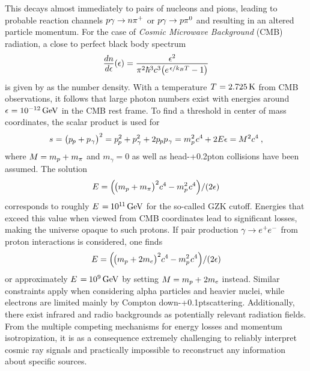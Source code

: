 This decays almost immediately to pairs of nucleons and pions, leading to probable reaction channels
$p\gamma \rightarrow \kern-0.1pt n\smash{\pi^+}$ or $p\gamma \rightarrow \kern+0.2pt p \smash{\pi^0}$ and resulting in an altered
particle momentum. For the case of \emph{Cosmic Microwave Background} (CMB) radiation, a close to perfect black
body spectrum
\begin{equation*}
	\frac{\raisebox{-0.3ex}{$dn$}}{\raisebox{0.15ex}{$d\epsilon$}} (\epsilon) \kern+0.2pt =
	\frac{\raisebox{-0.3ex}{$\epsilon^2$}}{\pi^2 \hbar^3 c^3 \bigl( e^{\kern+1.0pt \epsilon / k_B T} - 1 \bigr)}
\end{equation*}
is given by \cite{Gaisser_2016} as the number density. With a temperature $\kern+0.5pt T \kern+0.5pt = \qty{2.725}{\kelvin}$ from CMB
observations, it follows that large photon numbers exist with energies around $\epsilon \kern+0.5pt = \qty{e-12}{\giga\electronvolt}$
in the CMB rest frame. To find a threshold in center of mass coordinates, the scalar product is used for
\begin{equation*}
	s \kern+0.3pt = \bigl( p_{\kern-0.5pt p} + p_{\kern+0.5pt \gamma} \bigr)^2 =
	p_{\kern-0.5pt p}^2 + p_{\kern+0.5pt \gamma}^2 + 2 p_{\kern-0.5pt p} p_{\kern+0.5pt \gamma} =
	m_p^2 \kern+0.8pt c^4 \kern-0.2pt + 2 E \epsilon = \kern-0.2pt M^2c^4 \: ,
\end{equation*}
where $M \kern-0.3pt = m_p + \kern+0.3pt m_\pi$ and $m_\gamma = 0$ as well as head-{\kern+0.2pt}on collisions have been assumed. The solution
\begin{equation*}
	E = \Bigl( \kern-1.0pt \bigl( m_p + m_\pi \bigr)^2 c^4 \kern-0.2pt - m_p^2 \kern+0.8pt c^4 \Bigr) / (2\epsilon)
\end{equation*}
corresponds to roughly $E \kern+1.0pt = \kern-0.5pt 10^{1 \kern-0.3pt 1} \kern+1.5pt \unit{\giga\electronvolt}$ for the so-called
GZK cutoff. Energies that exceed this value when viewed from CMB coordinates lead to significant losses, making the universe
opaque to such protons. If pair production $\gamma \kern-0.5pt \rightarrow \smash{e^+ \kern-0.5pt e^-}$ from proton interactions is
considered, one finds
\begin{equation*}
	E = \Bigl( \kern-1.0pt \bigl( m_p + 2m_e \bigr)^2 c^4 \kern-0.2pt - m_p^2 \kern+0.8pt c^4 \Bigr) / (2\epsilon)
\end{equation*}
or approximately $E \kern+1.0pt = \kern-0.5pt \qty{e+9}{\giga\electronvolt}$ by setting $M \kern-0.3pt = m_p + \kern+0.3pt 2m_e$
instead. Similar constraints apply when considering alpha particles and heavier nuclei, while electrons are limited mainly by Compton
down-{\kern+0.1pt}scattering. Additionally, there exist infrared and radio backgrounds as potentially relevant radiation fields. From
the multiple competing mechanisms for energy losses and momentum isotropization, it is as a consequence extremely challenging
to reliably interpret cosmic ray signals and practically impossible to reconstruct any information about specific sources.




